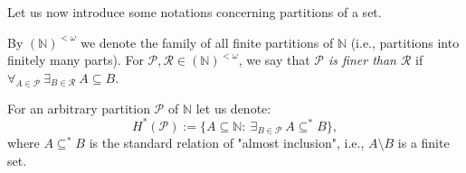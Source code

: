 \documentclass{amsart}
\newtheorem{prop}[thm]{Proposition}
\theoremstyle{definition}
\theoremstyle{definition}
\newcommand{\N}{{\mathbb N}}
\newcommand{\I}{\mathcal I}
\newcommand{\bw}{\text{BW}}
\newcommand{\Partitions}{(\omega)^{\leq \omega}}
\newcommand{\FinPart}{(\N)^{< \omega}}
\begin{document}
Let us now introduce some notations concerning partitions of a set. 

By $\FinPart$ we denote the family of all finite partitions of $\N$ (i.e., partitions into finitely many parts). For $\mathcal{P}, \mathcal{R} \in \FinPart$, we say that \emph{$\mathcal{P}$ is finer than $\mathcal{R}$} if $\forall_{A \in \mathcal{P}}\ \exists_{B \in \mathcal{R}}\ A \subseteq B$.


For an arbitrary partition $\mathcal{P}$ of $\N$ let us denote: 
$$H^{*}(\mathcal{P}) := \{A\subseteq\N :\ \exists_{B\in\mathcal{P}}\ A\subseteq^{*} B\},$$ 
where $A\subseteq^{*} B$ is the standard relation of "almost inclusion", i.e., $A\setminus B$ is a finite set.\\

\end{document}
